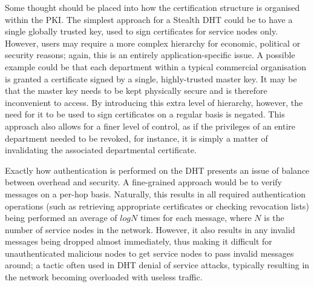 \documentclass[times, 10pt,twocolumn]{article}
\begin{document}
\label{sect-considerations}



Some thought should be placed into how the certification structure is
organised within the PKI. The simplest approach for a Stealth DHT could
be to have a single globally trusted key, used to sign certificates for
service nodes only. However, users may require a more complex hierarchy
for economic, political or security reasons; again, this is an entirely
application-specific issue. A possible example could be that each
department within a typical commercial organisation is granted a
certificate signed by a single, highly-trusted master key. It may be
that the master key needs to be kept physically secure and is therefore
inconvenient to access. By introducing this extra level of hierarchy,
however, the need for it to be used to sign certificates on a regular
basis is negated. This approach also allows for a finer level of
control, as if the privileges of an entire department needed to be
revoked, for instance, it is simply a matter of invalidating the
associated departmental certificate.

%

\label{subsect-granularity}

Exactly how authentication is performed on the DHT presents an issue of
balance between overhead and security. A fine-grained approach would be
to verify messages on a per-hop basis. Naturally, this results in all
required authentication operations (such as retrieving appropriate
certificates or checking revocation lists) being performed an average
of $log{N}$ times for each message, where $N$ is the number of service
nodes in the network. However, it also results in any invalid messages
being dropped almost immediately, thus making it difficult for
unauthenticated malicious nodes to get service nodes to pass invalid
messages around; a tactic often used in DHT denial of service attacks,
typically resulting in the network becoming overloaded with useless
traffic.
\end{document}
